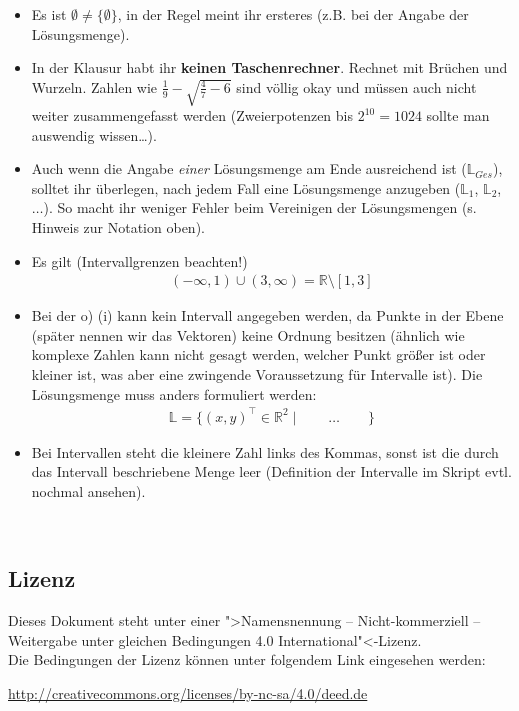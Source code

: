 \documentclass[11pt, a4paper]{article}
\newcommand{\Lsg}{\mathbb{L}}
\newcommand{\R}{\mathbb{R}}
\begin{document}
\begin{itemize}
\item Es ist $\emptyset \neq \{\emptyset\}$, in der Regel meint ihr ersteres (z.B. bei der Angabe der Lösungsmenge).

\item In der Klausur habt ihr \textbf{keinen Taschenrechner}. Rechnet mit Brüchen und Wurzeln. Zahlen wie $\frac{1}{9} - \sqrt{\frac{4}{7}-6}$ sind völlig okay und müssen auch nicht weiter zusammengefasst werden (Zweierpotenzen bis $2^{10} = 1024$ sollte man auswendig wissen\dots).

\item Auch wenn die Angabe \emph{einer} Lösungsmenge am Ende ausreichend ist ($\Lsg_{Ges}$), solltet ihr überlegen, nach jedem Fall eine Lösungsmenge anzugeben ($\Lsg_1$, $\Lsg_2$, $\dots$). So macht ihr weniger Fehler beim Vereinigen der Lösungsmengen (s. Hinweis zur Notation oben).

\item Es gilt (Intervallgrenzen beachten!)
\begin{align*}
(-\infty, 1) \cup (3, \infty) = \R \setminus [1, 3]
\end{align*}

\item Bei der o) (i) kann kein Intervall angegeben werden, da Punkte in der Ebene (später nennen wir das Vektoren) keine Ordnung besitzen (ähnlich wie komplexe Zahlen kann nicht gesagt werden, welcher Punkt größer ist oder kleiner ist, was aber eine zwingende Voraussetzung für Intervalle ist). Die Lösungsmenge muss anders formuliert werden:
\begin{align*}
\Lsg = \{ (x,y)^\intercal \in \R^2 \mid \qquad \dots \qquad \}
\end{align*}

\item Bei Intervallen steht die kleinere Zahl links des Kommas, sonst ist die durch das Intervall beschriebene Menge leer (Definition der Intervalle im Skript evtl. nochmal ansehen).
\end{itemize}








\newpage
~
\vfill
{\footnotesize
\subsection*{Lizenz}
Dieses Dokument steht unter einer ">Namensnennung -- Nicht-kommerziell -- Weitergabe unter gleichen Bedingungen 4.0 International"<-Lizenz.\\

\noindent
Die Bedingungen der Lizenz können unter folgendem Link eingesehen werden: 

\noindent
\url{http://creativecommons.org/licenses/by-nc-sa/4.0/deed.de}}
\end{document}
